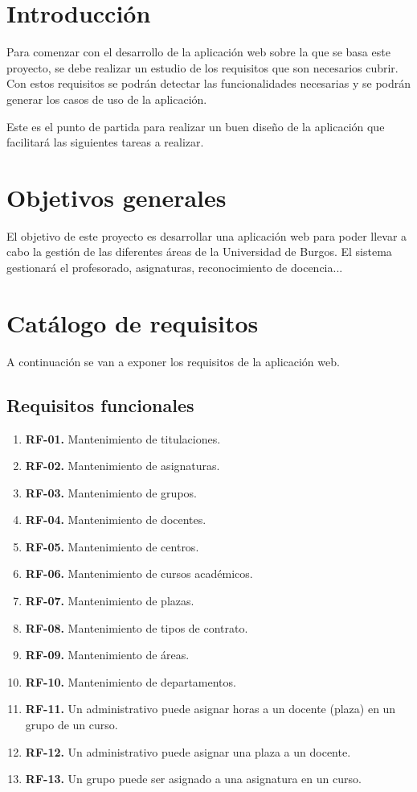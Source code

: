 
\section{Introducción}
Para comenzar con el desarrollo de la aplicación web sobre la que se basa este proyecto, se debe realizar un estudio de los requisitos que son necesarios cubrir. 
Con estos requisitos se podrán detectar las funcionalidades necesarias y se podrán generar los casos de uso de la aplicación.

Este es el punto de partida para realizar un buen diseño de la aplicación que facilitará las siguientes tareas a realizar.

\section{Objetivos generales}
El objetivo de este proyecto es desarrollar una aplicación web para poder llevar a cabo la gestión de las diferentes áreas de la Universidad de Burgos. El sistema gestionará el profesorado, asignaturas, reconocimiento de docencia...

\section{Catálogo de requisitos}
A continuación se van a exponer los requisitos de la aplicación web.
\subsection{Requisitos funcionales}
\begin{enumerate}
	\item \textbf{RF-01.} Mantenimiento de titulaciones.\label{itm:RF1}
	\item \textbf{RF-02.} Mantenimiento de asignaturas.\label{itm:RF2}
	\item \textbf{RF-03.} Mantenimiento de grupos.\label{itm:RF3}
	\item \textbf{RF-04.} Mantenimiento de docentes.\label{itm:RF4}
	\item \textbf{RF-05.} Mantenimiento de centros.\label{itm:RF5}
	\item \textbf{RF-06.} Mantenimiento de cursos académicos.\label{itm:RF6}
	\item \textbf{RF-07.} Mantenimiento de plazas.\label{itm:RF7}
	\item \textbf{RF-08.} Mantenimiento de tipos de contrato.\label{itm:RF8}
	\item \textbf{RF-09.} Mantenimiento de áreas.\label{itm:RF9}
	\item \textbf{RF-10.} Mantenimiento de departamentos.\label{itm:RF10}
	\item \textbf{RF-11.} Un administrativo puede asignar horas a un docente (plaza) en un grupo de un curso.\label{itm:RF11}
	\item \textbf{RF-12.} Un administrativo puede asignar una plaza a un docente.\label{itm:RF12}
	\item \textbf{RF-13.} Un grupo puede ser asignado a una asignatura en un curso.\label{itm:RF13}
\end{enumerate}

